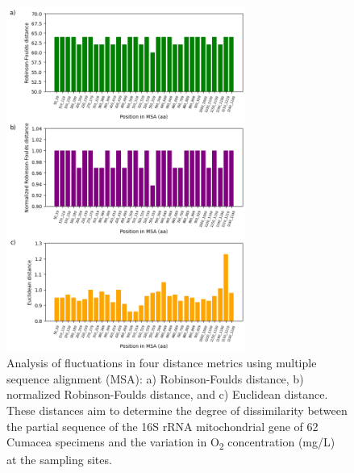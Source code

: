 {\begin{figure}[]
    \centering
    \includegraphics[width=0.7\textwidth]{figure6.png}
    \caption{Analysis of fluctuations in four distance metrics using multiple sequence alignment (MSA): a) Robinson-Foulds distance, b) normalized Robinson-Foulds distance, and c) Euclidean distance. These distances aim to determine the degree of dissimilarity between the partial sequence of the 16S rRNA mitochondrial gene of 62 Cumacea specimens and the variation in O\textsubscript{2} concentration (mg/L) at the sampling sites. \label{fig:fig7}}
\end{figure}

}
